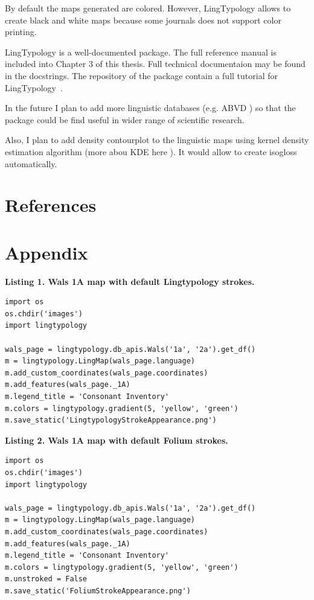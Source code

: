 \documentclass[a4paper,12pt]{article}
\begin{document}
By default the maps generated are colored. However, LingTypology allows to create black and white maps because some journals does not support color printing.

LingTypology is a well-documented package. The full reference manual is included into Chapter 3 of this thesis. Full technical documentaion may be found in the docstrings. The repository of the package contain a full tutorial for LingTypology~\parencite{Govnov2019}.

In the future I plan to add more linguistic databases (e.g. ABVD \parencite{abvd}) so that the package could be find useful in wider range of scientific research.

Also, I plan to add density contourplot to the linguistic maps using kernel density estimation algorithm (more abou KDE here \parencite{kde}). It would allow to create isogloss automatically.

\newpage

\section{References}
\printbibliography[type=misc, title=Programming Tools]
\printbibliography[type=manual, title=Documentation]
\printbibliography[type=online, title=Online Recources]
\printbibliography[type=article, title=Articles]
\printbibliography[filter=other, title=Other]
\newpage
\section{Appendix}

\textbf{Listing 1. Wals 1A map with default Lingtypology strokes.}
\begin{lstlisting}
import os
os.chdir('images')
import lingtypology

wals_page = lingtypology.db_apis.Wals('1a', '2a').get_df()
m = lingtypology.LingMap(wals_page.language)
m.add_custom_coordinates(wals_page.coordinates)
m.add_features(wals_page._1A)
m.legend_title = 'Consonant Inventory'
m.colors = lingtypology.gradient(5, 'yellow', 'green')
m.save_static('LingtypologyStrokeAppearance.png')
\end{lstlisting}
\bigskip

\textbf{Listing 2. Wals 1A map with default Folium strokes.}
\begin{lstlisting}
import os
os.chdir('images')
import lingtypology

wals_page = lingtypology.db_apis.Wals('1a', '2a').get_df()
m = lingtypology.LingMap(wals_page.language)
m.add_custom_coordinates(wals_page.coordinates)
m.add_features(wals_page._1A)
m.legend_title = 'Consonant Inventory'
m.colors = lingtypology.gradient(5, 'yellow', 'green')
m.unstroked = False
m.save_static('FoliumStrokeAppearance.png')
\end{lstlisting}
\bigskip
\end{document}
